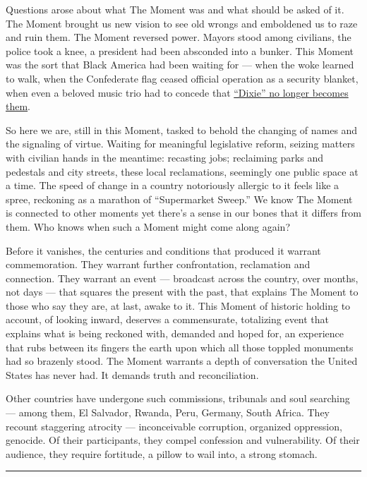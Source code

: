 Questions arose about what The Moment was and what should be asked of
it. The Moment brought us new vision to see old wrongs and emboldened us
to raze and ruin them. The Moment reversed power. Mayors stood among
civilians, the police took a knee, a president had been absconded into a
bunker. This Moment was the sort that Black America had been waiting for
--- when the woke learned to walk, when the Confederate flag ceased
official operation as a security blanket, when even a beloved music trio
had to concede that
\href{https://www.nytimes3xbfgragh.onion/2020/06/25/arts/music/dixie-chicks-change-name.html}{``Dixie''
no longer becomes them}.

So here we are, still in this Moment, tasked to behold the changing of
names and the signaling of virtue. Waiting for meaningful legislative
reform, seizing matters with civilian hands in the meantime: recasting
jobs; reclaiming parks and pedestals and city streets, these local
reclamations, seemingly one public space at a time. The speed of change
in a country notoriously allergic to it feels like a spree, reckoning as
a marathon of ``Supermarket Sweep.'' We know The Moment is connected to
other moments yet there's a sense in our bones that it differs from
them. Who knows when such a Moment might come along again?

Before it vanishes, the centuries and conditions that produced it
warrant commemoration. They warrant further confrontation, reclamation
and connection. They warrant an event --- broadcast across the country,
over months, not days --- that squares the present with the past, that
explains The Moment to those who say they are, at last, awake to it.
This Moment of historic holding to account, of looking inward, deserves
a commensurate, totalizing event that explains what is being reckoned
with, demanded and hoped for, an experience that rubs between its
fingers the earth upon which all those toppled monuments had so brazenly
stood. The Moment warrants a depth of conversation the United States has
never had. It demands truth and reconciliation.

Other countries have undergone such commissions, tribunals and soul
searching --- among them, El Salvador, Rwanda, Peru, Germany, South
Africa. They recount staggering atrocity --- inconceivable corruption,
organized oppression, genocide. Of their participants, they compel
confession and vulnerability. Of their audience, they require fortitude,
a pillow to wail into, a strong stomach.

\begin{center}\rule{0.5\linewidth}{\linethickness}\end{center}

